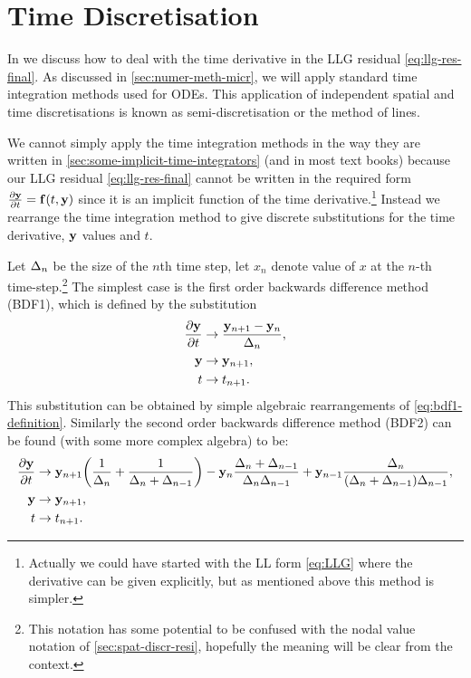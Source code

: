 \section{Time Discretisation}
\label{sec:time-discretisation-resi}

In  we discuss how to deal with the time derivative in the LLG residual \cref{eq:llg-res-final}.
As discussed in \cref{sec:numer-meth-micr}, we will apply standard time integration methods used for ODEs.
This application of independent spatial and time discretisations is known as semi-discretisation or the method of lines.

We cannot simply apply the time integration methods in the way they are written in \cref{sec:some-implicit-time-integrators} (and in most text books) because our LLG residual \cref{eq:llg-res-final} cannot be written in the required form $\frac{\partial \mathbf{y}}{\partial t} = {\mathbf{f}}(t, \mathbf{y})$ since it is an implicit function of the time derivative.\footnote{Actually we could have started with the LL form \cref{eq:LLG} where the derivative can be given explicitly, but as mentioned above this method is simpler.}
Instead we rearrange the time integration method to give discrete substitutions for the time derivative, $\mathbf{y}$ values and $t$.

Let $\Delta_{n}$ be the size of the $n$th time step, let $x_n$ denote value of $x$ at the $n$-th time-step.\footnote{This notation has some potential to be confused with the nodal value notation of \cref{sec:spat-discr-resi}, hopefully the meaning will be clear from the context.}
The simplest case is the first order backwards difference method (BDF1), which is defined by the substitution
\begin{equation}
  \begin{aligned}
    \frac{\partial \mathbf{y}}{\partial t} &\rightarrow \frac{\mathbf{y}_{n+1} - \mathbf{y}_n}{\Delta_{n}}, \\
    \mathbf{y} &\rightarrow \mathbf{y}_{n+1}, \\
    t &\rightarrow t_{n+1}.
    \label{eq:impl-bdf1}
  \end{aligned}
\end{equation}
This substitution can be obtained by simple algebraic rearrangements of \cref{eq:bdf1-definition}.
Similarly the second order backwards difference method (BDF2) can be found (with some more complex algebra) to be:
\begin{equation}
  \begin{aligned}
    \frac{\partial \mathbf{y}}{\partial t} &\rightarrow \mathbf{y}_{n+1}{\left( \frac{1}{\Delta_{n}} + \frac{1}{\Delta_{n} + \Delta_{n-1}} \right)}
    - \mathbf{y}_n \frac{\Delta_{n} + \Delta_{n-1}}{\Delta_{n}\Delta_{n-1}}
    + \mathbf{y}_{n-1} \frac{\Delta_{n}}{(\Delta_{n} + \Delta_{n-1})\Delta_{n-1}}, \\
    \mathbf{y} &\rightarrow \mathbf{y}_{n+1}, \\
    t &\rightarrow t_{n+1}.
    \label{eq:impl-bdf2}
  \end{aligned}
\end{equation}

